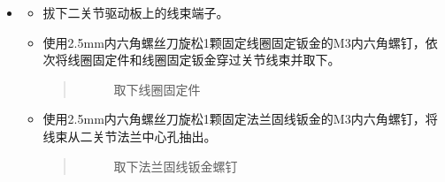 \documentclass[a4paper,11pt,english,openany,oneside]{sphinxmanual}
\begin{document}
\begin{itemize}
\begin{itemize}
\begin{quote}
\begin{figure}[H]
\centering
\capstart

\noindent{}
\caption{旋松一关节螺钉}\label{\detokenize{_u66f4_u6362_u5173_u8282:id120}}\end{figure}
\end{quote}

\item {} 
\sphinxAtStartPar
缓慢将二关节取下，同时将线束从一关节的出线孔逐一抽出，为防止线束端子卡住，推荐先抽出电源线，再抽出EtherCAT线。
\begin{quote}

\begin{figure}[H]
\centering
\capstart

\noindent{}
\caption{分离二关节}\label{\detokenize{_u66f4_u6362_u5173_u8282:id121}}\end{figure}
\end{quote}

\end{itemize}

\item {} 
\sphinxAtStartPar
{}
\begin{itemize}
\item {} 
\sphinxAtStartPar
拔下二关节驱动板上的线束端子。

\item {} 
\sphinxAtStartPar
使用2.5mm内六角螺丝刀旋松1颗固定线圈固定钣金的M3内六角螺钉，依次将线圈固定件和线圈固定钣金穿过关节线束并取下。
\begin{quote}

\begin{figure}[H]
\centering
\capstart

\noindent{}
\caption{取下线圈固定件}\label{\detokenize{_u66f4_u6362_u5173_u8282:id122}}\end{figure}
\end{quote}

\item {} 
\sphinxAtStartPar
使用2.5mm内六角螺丝刀旋松1颗固定法兰固线钣金的M3内六角螺钉，将线束从二关节法兰中心孔抽出。
\begin{quote}

\begin{figure}[H]
\centering
\capstart

\noindent{}
\caption{取下法兰固线钣金螺钉}\label{\detokenize{_u66f4_u6362_u5173_u8282:id123}}\end{figure}


\end{quote}
\end{itemize}
\end{itemize}
\end{document}
